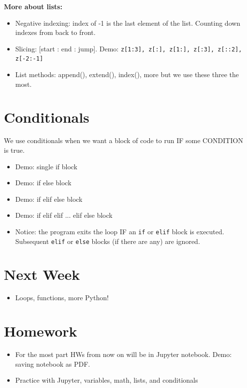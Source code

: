 \documentclass[12pt]{article}
\numberwithin{equation}{section}
\begin{document}
\textbf{More about lists:}
\begin{itemize}
    \item Negative indexing: index of -1 is the last element of the list. Counting down indexes from back to front.
    \item Slicing: [start : end : jump]. Demo: \verb|z[1:3], z[:], z[1:], z[:3], z[::2], z[-2:-1]|
    \item List methods: append(), extend(), index(), more but we use these three the most.
\end{itemize}

\section{Conditionals}
We use conditionals when we want a block of code to run IF some CONDITION is true.
\begin{itemize}
    \item Demo: single if block
    \item Demo: if else block
    \item Demo: if elif else block
    \item Demo: if elif elif ... elif else block
    \item Notice: the program exits the loop IF an \verb|if| or \verb|elif| block is executed. Subsequent \verb|elif| or \verb|else| blocks (if there are any) are ignored.
\end{itemize}

\section{Next Week}
\begin{itemize}
    \item Loops, functions, more Python!
\end{itemize}

\section{Homework}
\begin{itemize}
    \item For the most part HWs from now on will be in Jupyter notebook. Demo: saving notebook as PDF.
    \item Practice with Jupyter, variables, math, lists, and conditionals
\end{itemize}
\end{document}
